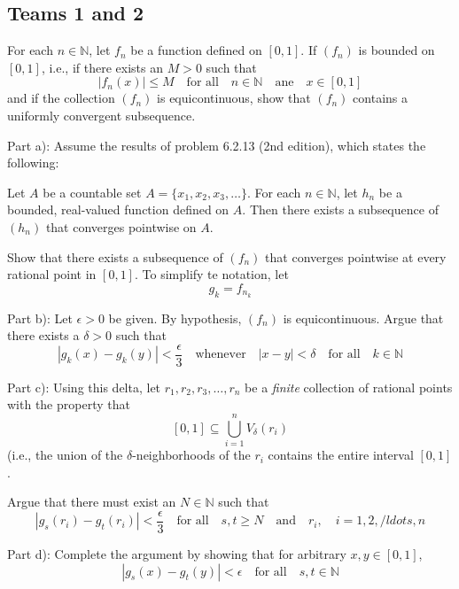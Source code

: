 \subsection*{Teams 1 and 2} 
\par\vspace{1 cm}
\begin{problem*} 
\par\vspace{0.3 cm}
For each $n\in\mathbb{N}$, let $f_n$ be a function defined on $[0,1]$.  If $(f_n)$ is bounded on $[0,1]$, i.e., if there exists
an $M>0$ such that 
\[
|f_n(x)| \leq M\quad\mbox{for all}\quad n\in\mathbb{N}\quad\mbox{ane}\quad x\in[0,1]
\]
and if the collection $(f_n)$ is equicontinuous, show that $(f_n)$ contains a uniformly convergent subsequence.
\par\vspace{0.3 cm}
Part a):  Assume the results of problem 6.2.13 (2nd edition), which states the following:
\par\vspace{0.3 cm}
Let $A$ be a countable set $A=\{x_1,x_2,x_3,\ldots\}$.  For each $n\in\mathbb{N}$, let $h_n$ be a bounded, real-valued function defined on $A$.  Then there exists a subsequence of $(h_n)$ that converges pointwise on $A$.
\par\vspace{0.3 cm}
Show that there exists a subsequence of $(f_n)$ that converges pointwise at every rational point in $[0,1]$.  To simplify te notation, let
\[
g_k = f_{n_k}
\]
\par\vspace{0.3 cm}
Part b): Let $\epsilon>0$ be given.  By hypothesis, $(f_n)$ is equicontinuous.  Argue that there exists a $\delta>0$ such that
\[
|g_k(x)-g_k(y)| < \frac{\epsilon}{3}\quad\mbox{whenever}\quad |x-y|<\delta\quad\mbox{for all}\quad k\in\mathbb{N} 
\] 
\par\vspace{0.3 cm}
Part c): Using this delta, let $r_1,r_2,r_3,\ldots,r_n$ be a \textit{finite} collection of rational points with the property that 
\[
[0,1]\subseteq\bigcup_{i=1}^nV_{\delta}(r_i)
\]
(i.e., the union of the $\delta$-neighborhoods of the $r_i$ contains the entire interval $[0,1]$.
\par\vspace{0.3 cm}
Argue that there must exist an $N\in\mathbb{N}$ such that
\[
|g_s(r_i)-g_t(r_i)| < \frac{\epsilon}{3}\quad\mbox{for all}\quad s,t\geq N\quad\mbox{and}\quad r_i,\quad i=1,2,/ldots,n
\]
\par\vspace{0.3 cm}
Part d): Complete the argument by showing that for arbitrary $x,y\in[0,1]$,
\[
|g_s(x)-g_t(y)| < \epsilon\quad\mbox{for all}\quad s,t\in\mathbb{N}
\]
\end{problem*}



